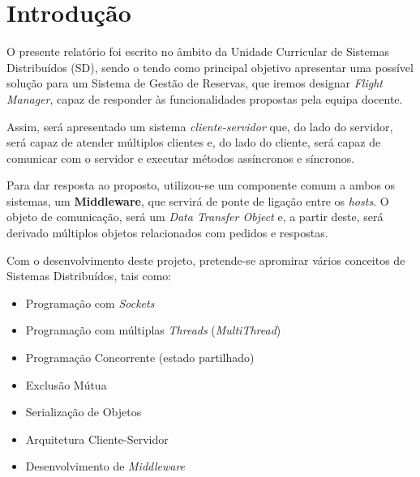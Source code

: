 \documentclass[a4paper,11pt]{scrreprt}
\begin{document}



\chapter{Introdução}

O presente relatório foi escrito no âmbito da Unidade Curricular de Sistemas Distribuídos (SD), sendo o
tendo como principal objetivo apresentar uma possível solução para um Sistema de Gestão de Reservas,
que iremos designar \textit{Flight Manager}, capaz de responder às funcionalidades propostas pela equipa docente.

Assim, será apresentado um sistema \textit{cliente-servidor} que, do lado do servidor,
será capaz de atender múltiplos clientes e, do lado do cliente, será capaz de comunicar com o servidor
e executar métodos assíncronos e síncronos.

Para dar resposta ao proposto, utilizou-se um componente comum a ambos os sistemas, um \textbf{Middleware},
que servirá de ponte de ligação entre os \textit{hosts}.
O objeto de comunicação, será um \textit{Data Transfer Object} e, a partir deste, será derivado
múltiplos objetos relacionados com pedidos e respostas.

Com o desenvolvimento deste projeto, pretende-se apromirar vários conceitos de Sistemas Distribuídos,
tais como:
\begin{itemize}
    \item Programação com \textit{Sockets}
    \item Programação com múltiplas \textit{Threads} (\textit{MultiThread})
    \item Programação Concorrente (estado partilhado)
    \item Exclusão Mútua
    \item Serialização de Objetos
    \item Arquitetura Cliente-Servidor
    \item Desenvolvimento de \textit{Middleware}
\end{itemize}
\end{document}

